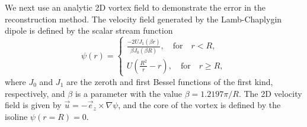 \documentclass[11pt]{article}
\begin{document}
We next use an analytic 2D vortex field to demonstrate the error in the reconstruction method. The velocity field generated by the Lamb-Chaplygin dipole is defined by the scalar stream function
\begin{equation}
    \psi(r) = \begin{cases}
    \frac{-2UJ_1(\beta r)}{\beta J_0(\beta R)}, \quad \text{for} \quad r < R,\\
    U\left(\frac{R^2}{r}-r\right), \quad \text{for} \quad r \ge R,    \end{cases}
\end{equation}
where $J_0$ and $J_1$ are the zeroth and first Bessel functions of the first kind, respectively, and $\beta$ is a parameter with the value $\beta=1.2197\pi/R$. The 2D velocity field is given by $\vec{u} = -\vec{e}_z\times \nabla \psi$, and the core of the vortex is defined by the isoline $\psi(r=R)=0$.

%     
\end{document}
